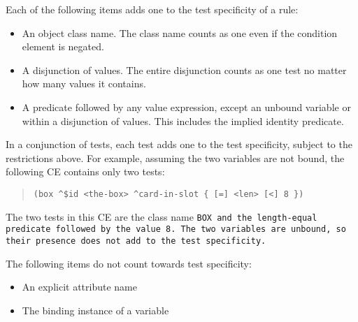 Each of the following items adds one to the test specificity of a
rule:
\begin{itemize}    
\item An object class name. The class name counts as one even if the
  condition element is negated.
\item A disjunction of values. The entire disjunction counts as one
  test no matter how many values it contains.
\item A predicate followed by any value expression, except an unbound
  variable or within a disjunction of values. This includes the
  implied identity predicate.
\end{itemize}
   
In a conjunction of tests, each test adds one to the test specificity,
subject to the restrictions above. For example, assuming the two
variables are not bound, the following CE contains only two tests:
\begin{quote}
\begin{verbatim}
(box ^$id <the-box> ^card-in-slot { [=] <len> [<] 8 })
\end{verbatim}
\end{quote}
The two tests in this CE are the class name \tt{BOX} and the
length-equal predicate followed by the value 8. The two variables are
unbound, so their presence does not add to the test specificity.
\begin{note}
  The following items do not count towards test specificity:
  \begin{itemize}
  \item An explicit attribute name
  \item The binding instance of a variable
  \end{itemize}
\end{note}


